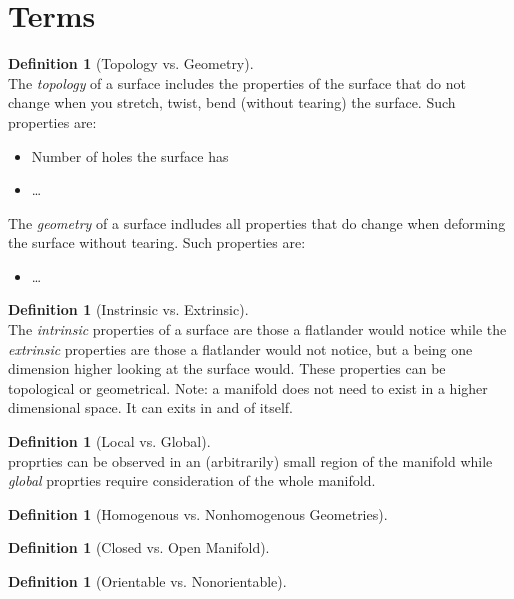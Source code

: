 \documentclass{article}[12pt]
\theoremstyle{definition}
\newtheorem{definition}[theorem]{Definition}
\begin{document}
\section{Terms}
\begin{definition}[Topology vs. Geometry]~\\
    The \emph{topology} of a surface includes the properties of the surface that do not change when you stretch, twist, bend (without tearing) the surface. Such properties are:
    \begin{itemize}
        \item Number of holes the surface has
        \item \dots
    \end{itemize}
    The \emph{geometry} of a surface indludes all properties that do change when deforming the surface without tearing. Such properties are:
    \begin{itemize}
        \item \dots
    \end{itemize}
\end{definition}

\begin{definition}[Instrinsic vs. Extrinsic]~\\
    The \emph{intrinsic} properties of a surface are those a flatlander would notice while the \emph{extrinsic} properties are those a flatlander would not notice, but a being one dimension higher looking at the surface would. These properties can be topological or geometrical. Note: a manifold does not need to exist in a higher dimensional space. It can exits in and of itself. 
\end{definition}
\begin{definition}[Local vs. Global]~\\
     proprties can be observed in an (arbitrarily) small region of the manifold while \emph{global} proprties require consideration of the whole manifold.
\end{definition}
\begin{definition}[Homogenous vs. Nonhomogenous Geometries]

\end{definition}
\begin{definition}[Closed vs. Open Manifold]

\end{definition}
\begin{definition}[Orientable vs. Nonorientable]

\end{definition}
\end{document}
